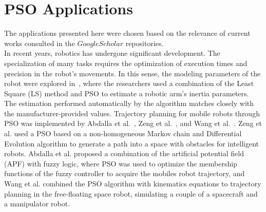 	

\section{PSO Applications} \label{sec:apps}

The applications presented here were chosen based on the relevance of current works consulted in the $Google Scholar$ repositories.\\
In recent years, robotics has undergone significant development. The specialization of many tasks requires the optimization of execution times and precision in the robot's movements.
In this sense, the modeling parameters of the robot were explored in~\cite{bingul2011dynamic}, where the researchers used a combination of the Least Square (LS) method and PSO to estimate a robotic arm's inertia parameters. The estimation performed automatically by the algorithm matches closely with the manufacturer-provided values. 
Trajectory planning for mobile robots through PSO was implemented by Abdalla et al.~\cite{abdalla2017mobile}, Zeng et al.~\cite{zeng2016path}, and Wang et al.~\cite{wang2015trajectory}. Zeng et al. used a PSO based on a non-homogeneous Markov chain and Differential Evolution algorithm to generate a path into a space with obstacles for intelligent robots. Abdalla et al. proposed a combination of the artificial potential field (APF) with fuzzy logic, where PSO was used to optimize the membership functions of the fuzzy controller to acquire the mobiles robot trajectory, and Wang et al. combined the PSO algorithm with kinematics equations to trajectory planning in the free-floating space robot, simulating a couple of a spacecraft and a manipulator robot.

